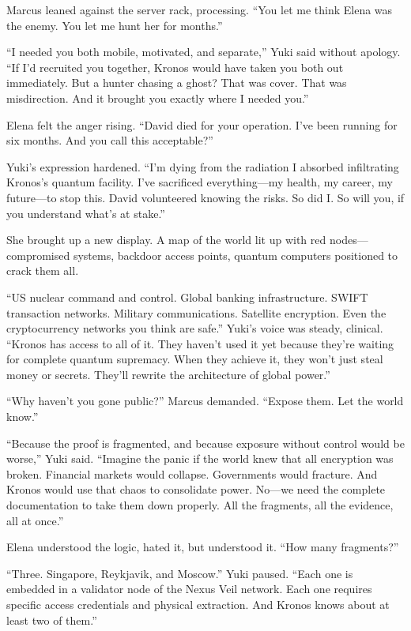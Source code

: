 Marcus leaned against the server rack, processing. ``You let me think Elena was the enemy. You let me hunt her for months.''

``I needed you both mobile, motivated, and separate,'' Yuki said without apology. ``If I'd recruited you together, Kronos would have taken you both out immediately. But a hunter chasing a ghost? That was cover. That was misdirection. And it brought you exactly where I needed you.''

Elena felt the anger rising. ``David died for your operation. I've been running for six months. And you call this acceptable?''

Yuki's expression hardened. ``I'm dying from the radiation I absorbed infiltrating Kronos's quantum facility. I've sacrificed everything---my health, my career, my future---to stop this. David volunteered knowing the risks. So did I. So will you, if you understand what's at stake.''

She brought up a new display. A map of the world lit up with red nodes---compromised systems, backdoor access points, quantum computers positioned to crack them all.

``US nuclear command and control. Global banking infrastructure. SWIFT transaction networks. Military communications. Satellite encryption. Even the cryptocurrency networks you think are safe.'' Yuki's voice was steady, clinical. ``Kronos has access to all of it. They haven't used it yet because they're waiting for complete quantum supremacy. When they achieve it, they won't just steal money or secrets. They'll rewrite the architecture of global power.''

``Why haven't you gone public?'' Marcus demanded. ``Expose them. Let the world know.''

``Because the proof is fragmented, and because exposure without control would be worse,'' Yuki said. ``Imagine the panic if the world knew that all encryption was broken. Financial markets would collapse. Governments would fracture. And Kronos would use that chaos to consolidate power. No---we need the complete documentation to take them down properly. All the fragments, all the evidence, all at once.''

Elena understood the logic, hated it, but understood it. ``How many fragments?''

``Three. Singapore, Reykjavik, and Moscow.'' Yuki paused. ``Each one is embedded in a validator node of the Nexus Veil network. Each one requires specific access credentials and physical extraction. And Kronos knows about at least two of them.''

